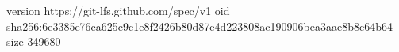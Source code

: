version https://git-lfs.github.com/spec/v1
oid sha256:6e3385e76ca625c9c1e8f2426b80d87e4d223808ac190906bea3aae8b8c64b64
size 349680
